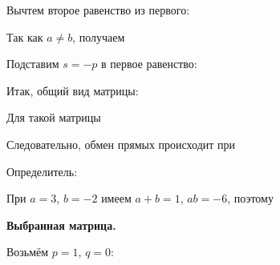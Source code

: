 \documentclass[a4paper,14pt]{extarticle}
\begin{document}
Вычтем второе равенство из первого: \begin{center}\end{center}

Так как \(a \neq b\), получаем \begin{center}\end{center}

Подставим \(s = -p\) в первое равенство: \begin{center}\end{center}

Итак, общий вид матрицы: \begin{center}\end{center}

Для такой матрицы \begin{center}\end{center}

Следовательно, обмен прямых происходит при \begin{center}\end{center}

Определитель: \begin{center}\end{center}

При \(a = 3\), \(b = -2\) имеем \(a + b = 1\), \(ab = -6\), поэтому \begin{center}\end{center}

\textbf{Выбранная матрица.}

Возьмём \(p = 1\), \(q = 0\): \begin{center}\end{center}
\end{document}
